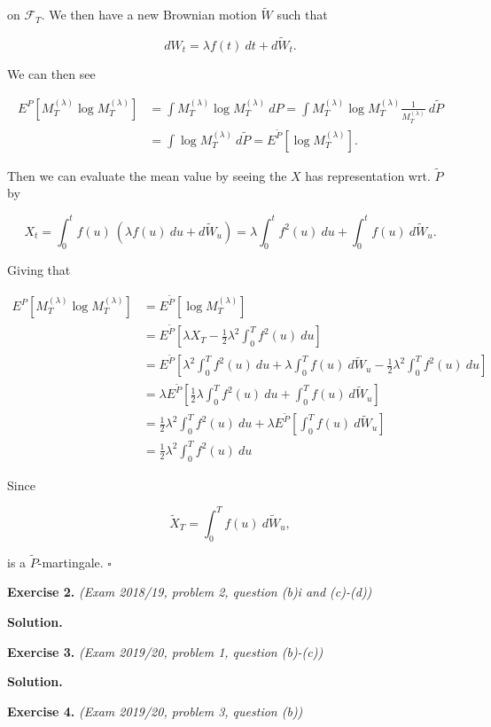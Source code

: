 \documentclass[
]{article}
\begin{document}
on \(\mathcal{F}_T\). We then have a new Brownian motion \(\tilde{W}\)
such that

\[
dW_t=\lambda f(t)\ dt + d\tilde{W}_t.
\]

We can then see

\begin{align*}
E^P[M_T^{(\lambda)}\log M_T^{(\lambda)}]&=\int M_T^{(\lambda)}\log M_T^{(\lambda)}\ dP=\int M_T^{(\lambda)}\log M_T^{(\lambda)} \frac{1}{M_T^{(\lambda)}}\ d\tilde{P}\\
&=\int \log M_T^{(\lambda)}\ d\tilde{P}=E^{\tilde{P}}[\log M_T^{(\lambda)}].
\end{align*}

Then we can evaluate the mean value by seeing the \(X\) has
representation wrt. \(\tilde{P}\) by

\[
X_t=\int_0^tf(u)\ (\lambda f(u)\ du + d\tilde{W}_u)=\lambda\int_0^tf^2(u)\ du+\int_0^tf(u)\ d\tilde{W}_u.
\]

Giving that

\begin{align*}
E^P[M_T^{(\lambda)}\log M_T^{(\lambda)}]&=E^{\tilde{P}}[\log M_T^{(\lambda)}]\\
&=E^{\tilde{P}}\left[ \lambda X_T-\frac{1}{2}\lambda ^2\int_0^T f^2(u)\ du \right]\\
&=E^{\tilde{P}}\left[ \lambda^2\int_0^Tf^2(u)\ du+\lambda\int_0^Tf(u)\ d\tilde{W}_u-\frac{1}{2}\lambda ^2\int_0^T f^2(u)\ du \right]\\
&=\lambda E^{\tilde{P}}\left[\frac{1}{2} \lambda\int_0^Tf^2(u)\ du+\int_0^Tf(u)\ d\tilde{W}_u \right]\\
&=\frac{1}{2} \lambda^2\int_0^Tf^2(u)\ du+\lambda E^{\tilde{P}}\left[\int_0^Tf(u)\ d\tilde{W}_u \right]\\
&=\frac{1}{2} \lambda^2\int_0^Tf^2(u)\ du
\end{align*}

Since

\[
\tilde{X}_T=\int_0^Tf(u)\ d\tilde{W}_u,
\]

is a \(\tilde{P}\)-martingale. \(\square\)

\textbf{Exercise 2.} \emph{(Exam 2018/19, problem 2, question (b)i and
(c)-(d))}

\textbf{Solution.}

\textbf{Exercise 3.} \emph{(Exam 2019/20, problem 1, question (b)-(c))}

\textbf{Solution.}

\textbf{Exercise 4.} \emph{(Exam 2019/20, problem 3, question (b))}
\end{document}
